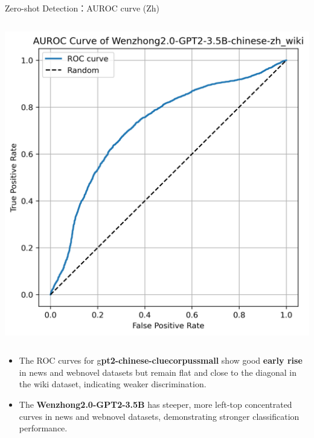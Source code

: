 \documentclass[serif]{beamer}
\begin{document}
\begin{frame}{Zero-shot Detection：AUROC curve (Zh)}
\begin{columns}[t]
    \centering
    \includegraphics[width=\linewidth]{images/Wenzhong2.0-GPT2-3.5B-chinese-zh_wiki.png}
\end{columns}
\begin{itemize}
  \item The ROC curves for g\textbf{pt2-chinese-cluecorpussmall} show good \textbf{early rise} in news and webnovel datasets but remain flat and close to the diagonal in the wiki dataset, indicating weaker discrimination.
  \item The \textbf{Wenzhong2.0-GPT2-3.5B} has steeper, more left-top concentrated curves in news and webnovel datasets, demonstrating stronger classification performance.
\end{itemize}
\end{frame}
\end{document}
